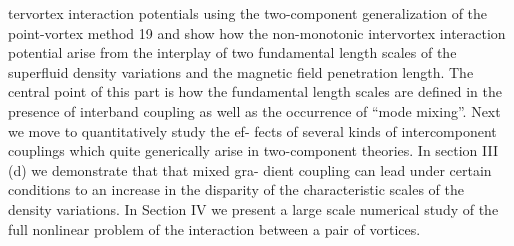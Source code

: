 tervortex interaction potentials using the two-component
generalization of the point-vortex method 19 and show
how the non-monotonic intervortex interaction potential
arise from the interplay of two fundamental length scales
of the superfluid density variations and the magnetic field
penetration length. The central point of this part is how
the fundamental length scales are defined in the presence
of interband coupling as well as the occurrence of “mode
mixing”. Next we move to quantitatively study the ef-
fects of several kinds of intercomponent couplings which
quite generically arise in two-component theories.
In section III (d) we demonstrate that that mixed gra-
dient coupling can lead under certain conditions to an
increase in the disparity of the characteristic scales of
the density variations.
In Section IV we present a large scale numerical study
of the full nonlinear problem of the interaction between
a pair of vortices.
